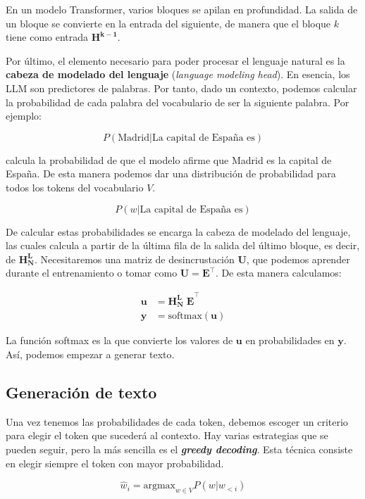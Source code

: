 \documentclass[12pt,twoside]{article}
\begin{document}
En un modelo Transformer, varios bloques se apilan en profundidad. La salida de un bloque se convierte en la entrada del siguiente, de manera que el bloque $k$ tiene como entrada $\mathbf{H^{k-1}}$.

Por último, el elemento necesario para poder procesar el lenguaje natural es la \textbf{cabeza de modelado del lenguaje} (\textit{language modeling head}). En esencia, los LLM son predictores de palabras. Por tanto, dado un contexto, podemos calcular la probabilidad de cada palabra del vocabulario de ser la siguiente palabra. Por ejemplo:

$$P(\text{Madrid}|\text{La capital de España es})$$

calcula la probabilidad de que el modelo afirme que Madrid es la capital de España. De esta manera podemos dar una distribución de probabilidad para todos los tokens del vocabulario $V$.

$$P(w|\text{La capital de España es})$$

De calcular estas probabilidades se encarga la cabeza de modelado del lenguaje, las cuales calcula a partir de la última fila de la salida del último bloque, es decir, de $\mathbf{H_N^{L}}$. Necesitaremos una matriz de desincrustación $\mathbf{U}$, que podemos aprender durante el entrenamiento o tomar como $\mathbf{U}=\mathbf{E}^\top$. De esta manera calculamos:

\begin{align}
    \mathbf{u} &= \mathbf{H_N^{L}\;E}^\top \\
    \mathbf{y} &= \text{softmax}(\mathbf{u})
\end{align}

La función softmax es la que convierte los valores de $\mathbf{u}$ en probabilidades en $\mathbf{y}$. Así, podemos empezar a generar texto.

\subsection{Generación de texto}
Una vez tenemos las probabilidades de cada token, debemos escoger un criterio para elegir el token que sucederá al contexto. Hay varias estrategias que se pueden seguir, pero la más sencilla es el \textit{\textbf{greedy decoding}}. Esta técnica consiste en elegir siempre el token con mayor probabilidad.

\begin{equation}
    \hat{w}_i=\text{argmax}_{w\in V}P(w|w_{<i})
\end{equation}
\end{document}
